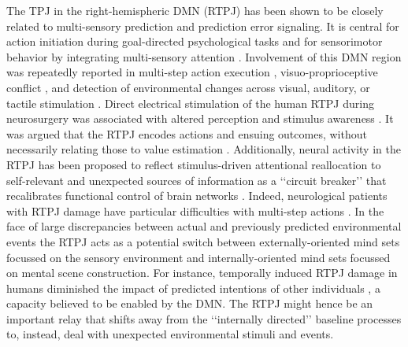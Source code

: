 \documentclass[10pt,letterpaper]{article}
\begin{document}
The TPJ in the right-hemispheric DMN (RTPJ)
has been shown to be closely related to
multi-sensory prediction and prediction error signaling.
It is central for action initiation during goal-directed psychological tasks and for
sensorimotor behavior by integrating multi-sensory attention
\citep{corbetta2002control}.
Involvement of this DMN region was repeatedly reported in
multi-step action execution \citep{hartmann2005takes},
visuo-proprioceptive conflict \citep{Balslev2005}, and
detection of environmental changes across
visual, auditory, or tactile stimulation
\citep{downar2000multimodal}.
Direct electrical stimulation of the human
RTPJ during neurosurgery was associated with altered perception
and stimulus awareness \citep{blanke2002neuropsychology}.
%
It was argued that the RTPJ encodes actions and ensuing outcomes,
without necessarily relating those to value estimation
\citep{liljeholm2013neural, hamilton2008action,
jakobs2009effects}.
Additionally, neural activity in the RTPJ has been proposed to reflect
stimulus-driven attentional reallocation to
self-relevant and unexpected sources of information
as a ‘‘circuit breaker’’ that recalibrates functional control of brain networks
\citep{bzdok2013tpj, corbettashul2008}.
Indeed, neurological patients with RTPJ damage have particular difficulties
with multi-step actions \citep{hartmann2005takes}.
In the face of large discrepancies between actual and previously predicted
environmental events the RTPJ acts as a potential switch between
externally-oriented mind sets focussed on the
sensory environment and internally-oriented mind sets focussed
on mental scene construction.
For instance, temporally induced RTPJ damage in humans diminished the
impact of predicted intentions of other individuals
\citep{young2010disruption},
a capacity believed to be enabled by the DMN.
The RTPJ might hence be an important relay that shifts away
from the ‘‘internally directed’’ baseline processes
to, instead, deal with unexpected environmental stimuli and events.
\end{document}
